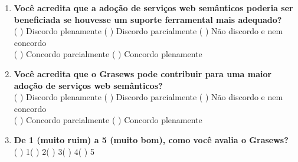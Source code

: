 \begin{enumerate}[label=Q\arabic*]
    \item
    \textbf{Você acredita que a adoção de serviços web semânticos poderia ser beneficiada se houvesse um suporte ferramental mais adequado?}
    \\
    ( ) Discordo plenamente ( ) Discordo parcialmente ( ) Não discordo e nem concordo
    \\
    ( ) Concordo parcialmente ( ) Concordo plenamente
    
    \item
    \textbf{Você acredita que o Grasews pode contribuir para uma maior adoção de serviços web semânticos?}
    \\
    ( ) Discordo plenamente ( ) Discordo parcialmente ( ) Não discordo e nem concordo
    \\
    ( ) Concordo parcialmente ( ) Concordo plenamente
    
    \item
    \textbf{De 1 (muito ruim) a 5 (muito bom), como você avalia o Grasews?}
    \\
    ( ) 1\hspace{1cm}( ) 2\hspace{1cm}( ) 3\hspace{1cm}( ) 4\hspace{1cm}( ) 5
    

\end{enumerate}
